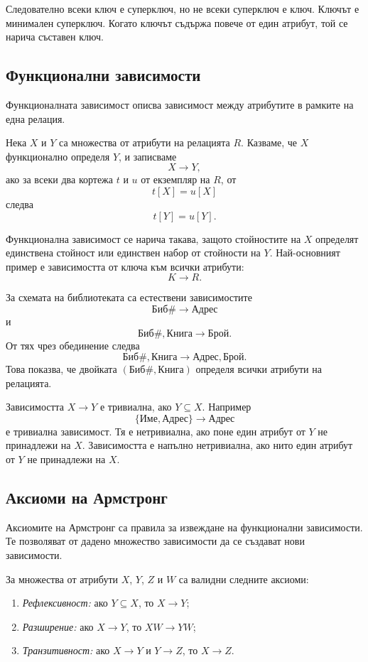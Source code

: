 Следователно всеки ключ е суперключ, но не всеки суперключ е ключ. Ключът е минимален суперключ. Когато ключът съдържа повече от един атрибут, той се нарича съставен ключ.

\subsection{Функционални зависимости}\label{s:24.1.4}

Функционалната зависимост описва зависимост между атрибутите в рамките на една релация.

\begin{defn}
Нека $X$ и $Y$ са множества от атрибути на релацията $R$. Казваме, че $X$ функционално определя $Y$, и записваме
\[
X\to Y,
\]
ако за всеки два кортежа $t$ и $u$ от екземпляр на $R$, от
\[
t[X]=u[X]
\]
следва
\[
t[Y]=u[Y].
\]
\end{defn}

Функционална зависимост се нарича такава, защото стойностите на $X$ определят единствена стойност или единствен набор от стойности на $Y$. Най-основният пример е зависимостта от ключа към всички атрибути:
\[
K\to R.
\]

За схемата на библиотеката са естествени зависимостите
\[
\mathrm{Биб\#}\to\mathrm{Адрес}
\]
и
\[
\mathrm{Биб\#},\mathrm{Книга}\to\mathrm{Брой}.
\]
От тях чрез обединение следва
\[
\mathrm{Биб\#},\mathrm{Книга}
\to
\mathrm{Адрес},\mathrm{Брой}.
\]
Това показва, че двойката $(\mathrm{Биб\#},\mathrm{Книга})$ определя всички атрибути на релацията.

Зависимостта $X\to Y$ е тривиална, ако $Y\subseteq X$. Например
\[
\{\mathrm{Име},\mathrm{Адрес}\}\to\mathrm{Адрес}
\]
е тривиална зависимост. Тя е нетривиална, ако поне един атрибут от $Y$ не принадлежи на $X$. Зависимостта е напълно нетривиална, ако нито един атрибут от $Y$ не принадлежи на $X$.

\subsection{Аксиоми на Армстронг}\label{s:24.1.5}

Аксиомите на Армстронг са правила за извеждане на функционални зависимости. Те позволяват от дадено множество зависимости да се създават нови зависимости.

\begin{thm}
За множества от атрибути $X$, $Y$, $Z$ и $W$ са валидни следните аксиоми:

\begin{enumerate}
    \item \emph{Рефлексивност:} ако $Y\subseteq X$, то $X\to Y$;
    \item \emph{Разширение:} ако $X\to Y$, то $XW\to YW$;
    \item \emph{Транзитивност:} ако $X\to Y$ и $Y\to Z$, то $X\to Z$.
\end{enumerate}
\end{thm}

